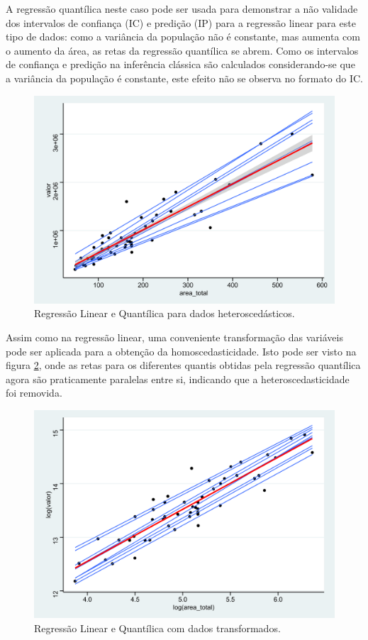 \documentclass[a4paper, 12pt]{article}
\begin{document}
A regressão quantílica neste caso pode ser usada para demonstrar a não
validade dos intervalos de confiança (IC) e predição (IP) para a
regressão linear para este tipo de dados: como a variância da população
não é constante, mas aumenta com o aumento da área, as retas da
regressão quantílica se abrem. Como os intervalos de confiança e
predição na inferência clássica são calculados considerando-se que a
variância da população é constante, este efeito não se observa no
formato do IC.

\begin{figure}[H]

{\centering \includegraphics[width=0.7\linewidth]{images/qr1-1} 

}

\caption{Regressão Linear e Quantílica para dados heteroscedásticos.}\label{fig:qr1}
\end{figure}

Assim como na regressão linear, uma conveniente transformação das
variáveis pode ser aplicada para a obtenção da homoscedasticidade. Isto
pode ser visto na figura \ref{fig:qr2}, onde as retas para os diferentes
quantis obtidas pela regressão quantílica agora são praticamente
paralelas entre si, indicando que a heteroscedasticidade foi removida.

\begin{figure}[H]

{\centering \includegraphics[width=0.7\linewidth]{images/qr2-1} 

}

\caption{Regressão Linear e Quantílica com dados transformados.}\label{fig:qr2}
\end{figure}
\end{document}
